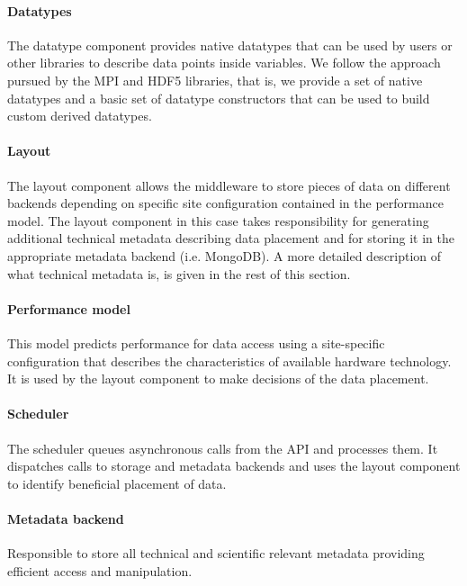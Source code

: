 \paragraph{Datatypes}
The datatype component provides native datatypes that can be used by users or other libraries to describe data points inside variables.
We follow the approach pursued by the MPI and HDF5 libraries, that is, we provide a set of native datatypes and a basic set of datatype constructors that can be used to build custom derived datatypes.

\paragraph{Layout}
The layout component allows the middleware to store pieces of data on different backends depending on specific site configuration contained in the performance model.
The layout component in this case takes responsibility for generating additional technical metadata describing data placement and for storing it in the appropriate metadata backend (i.e. MongoDB).
A more detailed description of what technical metadata is, is given in the rest of this section.

\paragraph{Performance model}
This model predicts performance for data access using a site-specific configuration that describes the characteristics of available hardware technology.
It is used by the layout component to make decisions of the data placement.

\paragraph{Scheduler}
The scheduler queues asynchronous calls from the API and processes them.
It dispatches calls to storage and metadata backends and uses the layout component to identify beneficial placement of data.

\paragraph{Metadata backend}
Responsible to store all technical and scientific relevant metadata providing efficient access and manipulation.

